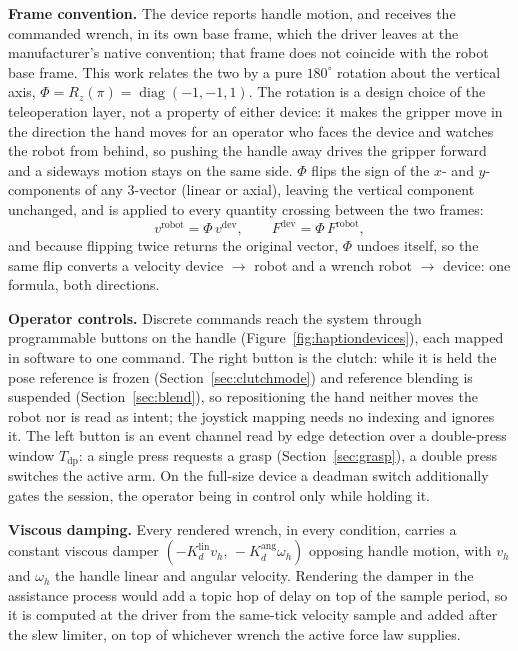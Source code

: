 \textbf{Frame convention.} The device reports handle motion, and receives the commanded wrench, in its own base frame, which the driver leaves at the manufacturer's native convention; that frame does not coincide with the robot base frame. This work relates the two by a pure $180^{\circ}$ rotation about the vertical axis, $\Phi = R_z(\pi) = \operatorname{diag}(-1,-1,1)$. The rotation is a design choice of the teleoperation layer, not a property of either device: it makes the gripper move in the direction the hand moves for an operator who faces the device and watches the robot from behind, so pushing the handle away drives the gripper forward and a sideways motion stays on the same side. $\Phi$ flips the sign of the $x$- and $y$-components of any 3-vector (linear or axial), leaving the vertical component unchanged, and is applied to every quantity crossing between the two frames:
\begin{equation}
v^{\text{robot}} = \Phi\, v^{\text{dev}},
\qquad
F^{\text{dev}} = \Phi\, F^{\text{robot}},
\label{eq:flip}
\end{equation}
and because flipping twice returns the original vector, $\Phi$ undoes itself, so the same flip converts a velocity device $\to$ robot and a wrench robot $\to$ device: one formula, both directions.

\textbf{Operator controls.}
\label{sec:opcontrols}
Discrete commands reach the system through programmable buttons on the handle (Figure~\ref{fig:haptiondevices}), each mapped in software to one command. The right button is the clutch: while it is held the pose reference is frozen (Section~\ref{sec:clutchmode}) and reference blending is suspended (Section~\ref{sec:blend}), so repositioning the hand neither moves the robot nor is read as intent; the joystick mapping needs no indexing and ignores it. The left button is an event channel read by edge detection over a double-press window $T_{\text{dp}}$: a single press requests a grasp (Section~\ref{sec:grasp}), a double press switches the active arm. On the full-size device a deadman switch additionally gates the session, the operator being in control only while holding it.

\textbf{Viscous damping.} Every rendered wrench, in every condition, carries a constant viscous damper $(-K_d^{\text{lin}} v_h,\, -K_d^{\text{ang}} \omega_h)$ opposing handle motion, with $v_h$ and $\omega_h$ the handle linear and angular velocity. Rendering the damper in the assistance process would add a topic hop of delay on top of the sample period, so it is computed at the driver from the same-tick velocity sample and added after the slew limiter, on top of whichever wrench the active force law supplies.

